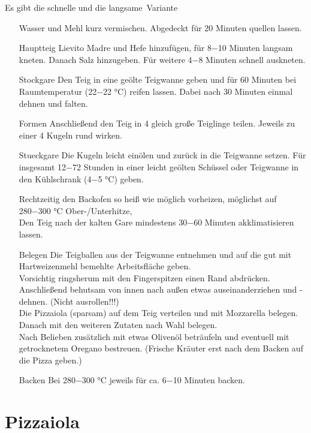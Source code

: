 Es gibt die schnelle und die \glqq langsame\grqq\ Variante
\begin{enumerate}
    \item [\GLS{Autolyse}] Wasser und Mehl kurz vermischen. Abgedeckt für 20 Minuten quellen lassen.
    
    \item [\Gls{Hauptteig}] Lievito Madre und Hefe hinzufügen, für 8−10 Minuten langsam kneten. Danach Salz hinzugeben. Für weitere 4−8 Minuten schnell auskneten.
    \item [\Gls{Stockgare}] Den Teig in eine geölte Teigwanne geben und für 60 Minuten bei Raumtemperatur (22−22 °C) reifen lassen.
    Dabei nach 30 Minuten einmal dehnen und falten.
    \item [\Gls{Formen}]  Anschließend den Teig in 4 gleich große Teiglinge teilen. Jeweils zu einer 4 Kugeln rund wirken.
    \item [\Gls{Stueckgare}]  Die Kugeln leicht einölen und zurück in die Teigwanne setzen. Für insgesamt 12−72 Stunden in einer leicht geölten Schüssel oder Teigwanne in den Kühlschrank (4−5 °C) geben.
    \item [\GLS{Akklimatisieren}] Rechtzeitig den Backofen so heiß wie möglich vorheizen, möglichst auf 280−300 °C Ober-/Unterhitze,\\
    Den Teig nach der kalten Gare mindestens 30−60 Minuten akklimatisieren lassen.
    \item[Belegen] 
    Die Teigballen aus der Teigwanne entnehmen und auf die gut mit Hartweizenmehl bemehlte Arbeitsfläche geben.\\
    Vorsichtig ringsherum mit den Fingerspitzen einen Rand abdrücken.
    Anschließend behutsam von innen nach außen etwas auseinanderziehen und -dehnen. (Nicht ausrollen!!!)\\
    Die Pizzaiola (sparsam) auf dem Teig verteilen und mit Mozzarella belegen.\\
    Danach mit den weiteren Zutaten nach Wahl belegen.\\
    Nach Belieben zusätzlich mit etwas Olivenöl beträufeln und eventuell mit getrocknetem Oregano bestreuen. (Frische Kräuter erst nach dem Backen auf die Pizza geben.)
    \item [\Gls{Backen}] Bei 280−300 °C jeweils für ca. 6−10 Minuten backen. 
\end{enumerate}
%

\section{Pizzaiola}
